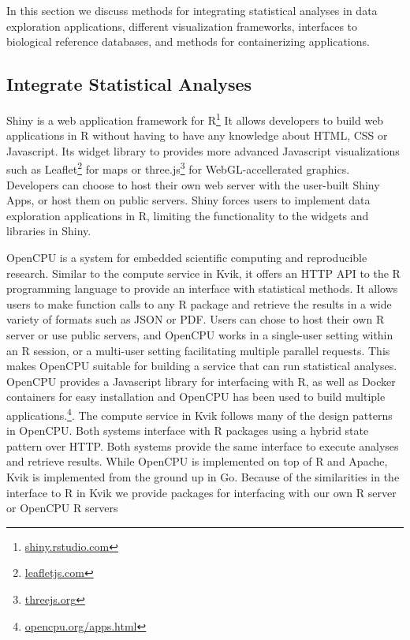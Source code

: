 In this section we discuss methods for integrating statistical analyses in data
exploration applications, different visualization frameworks, interfaces to
biological reference databases, and methods for containerizing applications. 

\subsection*{Integrate Statistical Analyses} 
Shiny is a web application framework for R\footnote{\url{shiny.rstudio.com}}
It allows developers to build web applications in R without having to have any
knowledge about HTML, CSS or Javascript. 
Its widget library to provides more advanced Javascript
visualizations such as Leaflet\footnote{\url{leafletjs.com}} for maps or
three.js\footnote{\url{threejs.org}} for WebGL-accellerated
graphics. Developers can choose to host their own web server with the user-built
Shiny Apps, or host them on public servers. Shiny forces users to implement data
exploration applications in R, limiting the functionality to the 
widgets and libraries in Shiny. 

OpenCPU is a system for embedded scientific computing and reproducible
research.\cite{opencpu} Similar to the compute service in Kvik, it offers an
HTTP API to the R programming language to provide an interface with statistical
methods. It allows users to make function calls to any R package and retrieve
the results in a wide variety of formats such as JSON or PDF. 
Users can chose to host their own R server or use public servers, and OpenCPU
works in a single-user setting within an R session, or a multi-user setting
facilitating multiple parallel requests. This makes OpenCPU suitable
for building a service that can run statistical analyses. 
OpenCPU provides a Javascript library for interfacing with R, as well as Docker
containers for easy installation and OpenCPU has been used to build multiple
applications.\footnote{\url{opencpu.org/apps.html}}. 
The compute service in Kvik follows many of the design patterns in
OpenCPU. Both systems interface with R packages using a hybrid state pattern
over HTTP. Both systems provide the same interface to execute analyses and
retrieve results.  While OpenCPU is implemented on top of R and Apache, Kvik is
implemented from the ground up in Go. Because of the similarities in the
interface to R in Kvik we provide packages for interfacing with our own R server
or OpenCPU R servers

